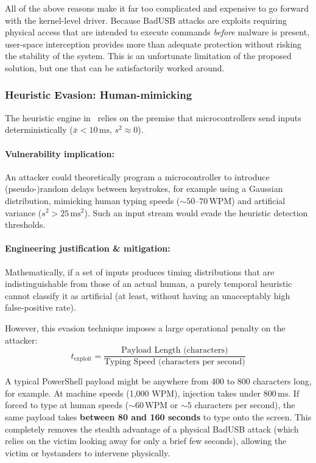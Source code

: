 All of the above reasons make it far too complicated and expensive to go forward with the kernel-level driver. Because BadUSB attacks are exploits requiring physical access that are intended to execute commands \textit{before} malware is present, user-space interception provides more than adequate protection without risking the stability of the system. This is an unfortunate limitation of the proposed solution, but one that can be satisfactorily worked around.

\subsubsection{Heuristic Evasion: Human-mimicking}

The heuristic engine in \projectNameFormatted\ relies on the premise that microcontrollers send inputs deterministically ($\bar{x} < 10\,\text{ms}$, $s^2 \approx 0$).

\paragraph{Vulnerability implication:}
An attacker could theoretically program a microcontroller to introduce (pseudo-)random delays between keystrokes, for example using a Gaussian distribution, mimicking human typing speeds ($\sim 50\text{--}70\,\text{WPM}$) and artificial variance ($s^2 > 25\,\text{ms}^2$). Such an input stream would evade the heuristic detection thresholds.

\paragraph{Engineering justification \& mitigation:}
Mathematically, if a set of inputs produces timing distributions that are indistinguishable from those of an actual human, a purely temporal heuristic cannot classify it as artificial (at least, without having an unacceptably high false-positive rate).

However, this evasion technique imposes a large operational penalty on the attacker:
\begin{equation}
	t_{\text{exploit}} = \frac{\text{Payload Length (characters)}}{\text{Typing Speed (characters per second)}}
\end{equation}

A typical PowerShell payload might be anywhere from 400 to 800 characters long, for example. At machine speeds (1,000 WPM), injection takes under $800\,\text{ms}$. If forced to type at human speeds ($\sim 60\,\text{WPM}$ or $\sim 5$ characters per second), the same payload takes \textbf{between 80 and 160 seconds} to type onto the screen. This completely removes the stealth advantage of a physical BadUSB attack (which relies on the victim looking away for only a brief few seconds), allowing the victim or bystanders to intervene physically.

